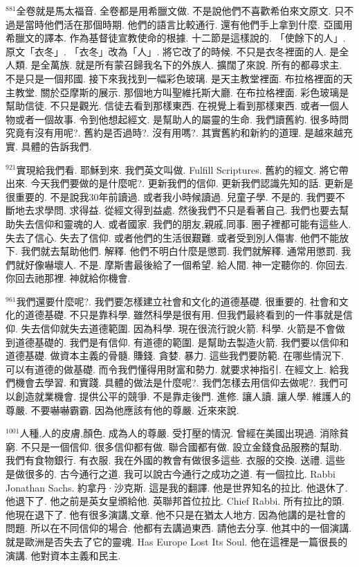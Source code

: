 \documentclass{book}
\begin{document}
$^{881}$全卷就是馬太福音.
全卷都是用希臘文做.
不是說他們不喜歡希伯來文原文.
只不過是當時他們活在那個時期.
他們的語言比較通行.
還有他們手上拿到什麼.
亞國用希臘文的譯本.
作為基督徒宣教使命的根據.
十二節是這樣說的.
「使餘下的人」.
原文「衣冬」.
「衣冬」改為「人」.
將它改了的時候.
不只是衣冬裡面的人.
是全人類.
是全萬族.
就是所有蒙召歸我名下的外族人.
擴闊了來說.
所有的都尋求主.
不是只是一個邦國.
接下來我找到一幅彩色玻璃.
是天主教堂裡面.
布拉格裡面的天主教堂.
關於亞摩斯的展示.
那個地方叫聖維托斯大廳.
在布拉格裡面.
彩色玻璃是幫助信徒.
不只是觀光.
信徒去看到那樣東西.
在視覺上看到那樣東西.
或者一個人物或者一個故事.
令到他想起經文.
是幫助人的屬靈的生命.
我們讀舊約.
很多時問究竟有沒有用呢?.
舊約是否過時?.
沒有用嗎?.
其實舊約和新約的道理.
是越來越充實.
具體的告訴我們.

$^{921}$實現給我們看.
耶穌到來.
我們英文叫做.
Fulfill Scriptures.
舊約的經文.
將它帶出來.
今天我們要做的是什麼呢?.
更新我們的信仰.
更新我們認識先知的話.
更新是很重要的.
不是說我30年前讀過.
或者我小時候讀過.
兒童子學.
不是的.
我們要不斷地去求學問.
求得益.
從經文得到益處.
然後我們不只是看著自己.
我們也要去幫助失去信仰和靈魂的人.
或者國家.
我們的朋友,親戚,同事.
圈子裡都可能有這些人.
失去了信心.
失去了信仰.
或者他們的生活很艱難.
或者受到別人傷害.
他們不能放下.
我們就去幫助他們.
解釋.
他們不明白什麼是懲罰.
我們就解釋.
通常用懲罰.
我們就好像嚇壞人.
不是.
摩斯書最後給了一個希望.
給人間.
神一定聽你的.
你回去.
你回去祂那裡.
神就給你機會.

$^{961}$我們還要什麼呢?.
我們要怎樣建立社會和文化的道德基礎.
很重要的.
社會和文化的道德基礎.
不只是靠科學.
雖然科學是很有用.
但我們最終看到的一件事就是信仰.
失去信仰就失去道德範圍.
因為科學.
現在很流行說火箭.
科學.
火箭是不會做到道德基礎的.
我們是有信仰.
有道德的範圍.
是幫助去製造火箭.
我們要以信仰和道德基礎.
做資本主義的骨髓.
賺錢.
貪婪.
暴力.
這些我們要防範.
在哪些情況下.
可以有道德的做基礎.
而令我們懂得用財富和勢力.
就要求神指引.
在經文上.
給我們機會去學習.
和實踐.
具體的做法是什麼呢?.
我們怎樣去用信仰去做呢?.
我們可以創造就業機會.
提供公平的競爭.
不是靠走後門.
進修.
讓人讀.
讓人學.
維護人的尊嚴.
不要嚇嚇霸霸.
因為他應該有他的尊嚴.
近來來說.

$^{1001}$人種,人的皮膚,顏色.
成為人的尊嚴.
受打壓的情況.
曾經在美國出現過.
消除貧窮.
不只是一個信仰.
很多信仰都有做.
聯合國都有做.
設立金錢食品服務的幫助.
我們有食物銀行.
有衣服.
我在外國的教會有做很多這些.
衣服的交換.
送禮.
這些是做很多的.
古今通行之道.
我可以說古今通行之成功之道.
有一個拉比.
Rabbi Jonathan Sachs.
約拿丹·沙克斯.
這是我的翻譯.
他是世界知名的拉比.
他退休了.
他退下了.
他之前是英女皇頒給他.
英聯邦首位拉比.
Chief Rabbi.
所有拉比的頭.
他現在退下了.
他有很多演講,文章.
他不只是在猶太人地方.
因為他講的是社會的問題.
所以在不同信仰的場合.
他都有去講過東西.
請他去分享.
他其中的一個演講.
就是歐洲是否失去了它的靈魂.
Has Europe Lost Its Soul.
他在這裡是一篇很長的演講.
他對資本主義和民主.
\end{document}
